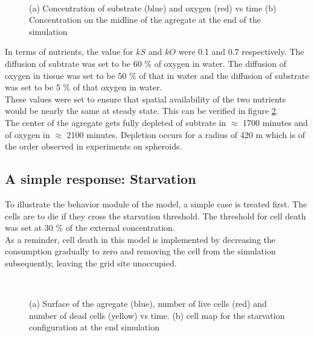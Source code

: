 \documentclass[11pt,a4paper]{article}
\begin{document}
\begin{figure}[ht!]
\begin{subfigure}{0.5\textwidth}
	\centering
	
	\caption{ \label{ref_SO_ctr}}
\end{subfigure}
~~
\begin{subfigure}{0.5\textwidth}
	\centering
	
	\caption{\label{ref_SO_ctrline}}
\end{subfigure}
\caption{(a) Concentration of substrate (blue) and oxygen (red) vs time (b) Concentration on the midline of the agregate at the end of the simulation \label{ref_SO}}
\end{figure}

In terms of nutrients, the value for $kS$ and $kO$ were 0.1 and 0.7 respectively. The diffusion of subtrate was set to be 60 \% of oxygen in water. The diffusion of oxygen in tissue was set to be 50 \% of that in water and the diffusion of substrate was set to be 5 \% of that oxygen in water.\\

These values were set to ensure that spatial availability of the two nutrients would be nearly the same at steady state. This can be verified in figure \ref{ref_SO_ctrline}. \\

The center of the agregate gets fully depleted of subtrate in $\approx$ 1700 minutes and of oxygen in $\approx$ 2100 minutes. Depletion occurs for a radius of 420 \textmu m which is of the order observed in experiments on spheroids.\cite{MullerKlieser1986}\cite{Freyer1988}\\

\subsection{A simple response: Starvation}
To illustrate the behavior module of the model, a simple case is treated first. The cells are to die if they cross the starvation threshold. The threshold for cell death was set at 30 \% of the external concentration.
\\

As a reminder, cell death in this model is implemented by decreasing the consumption gradually to zero and removing the cell from the simulation subsequently, leaving the grid site unoccupied.\\


\begin{figure}[ht!]
\begin{subfigure}{0.5\textwidth}
	\centering
	
	\caption{ \label{starv_area}}
\end{subfigure}
~~
\begin{subfigure}{0.5\textwidth}
	\centering
	
	\caption{\label{starv_Grid}}
\end{subfigure}
\caption{(a) Surface of the agregate (blue), number of live cells (red) and number of dead cells (yellow) vs time. (b) cell map for the starvation configuration at the end simulation \label{starv_Grid}}
\end{figure}
\end{document}
